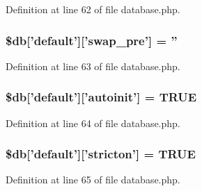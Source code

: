 Definition at line 62 of file database.\-php.

\hypertarget{development_2database_8php_af35b6847ece1c0a956c97ebb90186e45}{
\subsubsection[{\$db}]{\setlength{\rightskip}{0pt plus 5cm}\$db\mbox{[}'default'\mbox{]}\mbox{[}'swap\-\_\-pre'\mbox{]} = ''}}\label{development_2database_8php_af35b6847ece1c0a956c97ebb90186e45}


Definition at line 63 of file database.\-php.

\hypertarget{development_2database_8php_a217a1c42eadc83da9cdd9e3d694e53fa}{
\subsubsection[{\$db}]{\setlength{\rightskip}{0pt plus 5cm}\$db\mbox{[}'default'\mbox{]}\mbox{[}'autoinit'\mbox{]} = T\-R\-U\-E}}\label{development_2database_8php_a217a1c42eadc83da9cdd9e3d694e53fa}


Definition at line 64 of file database.\-php.

\hypertarget{development_2database_8php_a5722ababeee63dd26d82734e3fa83b7c}{
\subsubsection[{\$db}]{\setlength{\rightskip}{0pt plus 5cm}\$db\mbox{[}'default'\mbox{]}\mbox{[}'stricton'\mbox{]} = T\-R\-U\-E}}\label{development_2database_8php_a5722ababeee63dd26d82734e3fa83b7c}


Definition at line 65 of file database.\-php.

